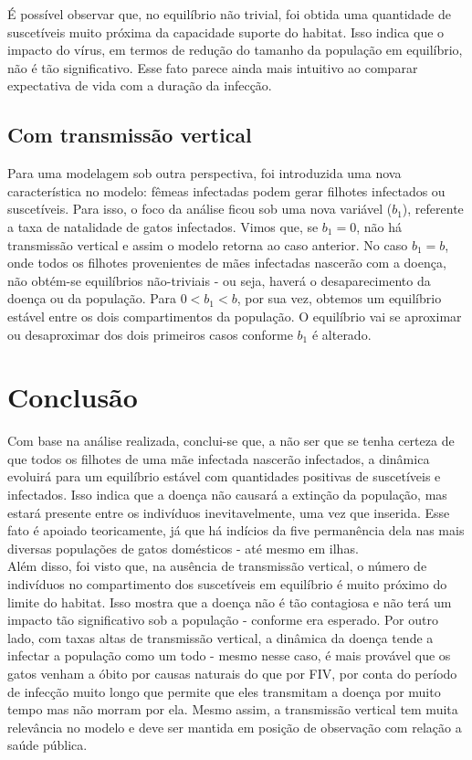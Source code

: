 \documentclass{article}
\begin{document}
\noindent É possível observar que, no equilíbrio não trivial, foi obtida uma quantidade de suscetíveis muito próxima da capacidade suporte do habitat. Isso indica que o impacto do vírus, em termos de redução do
tamanho da população em equilíbrio, não é tão significativo. Esse fato parece ainda mais intuitivo ao comparar expectativa de vida com a duração da infecção.

\subsection{Com transmissão vertical}
Para uma modelagem sob outra perspectiva, foi introduzida uma nova característica no modelo: fêmeas infectadas podem gerar filhotes infectados ou suscetíveis. Para isso, o foco da análise ficou sob uma nova variável ($b_1$), referente a taxa de natalidade de gatos infectados. Vimos que, se $b_1 = 0$, não há transmissão vertical e assim o modelo retorna ao caso anterior. No caso $b_1 = b$, onde todos os filhotes provenientes de mães infectadas nascerão com a doença, não obtém-se equilíbrios não-triviais - ou seja, haverá o desaparecimento da doença ou da população. Para $0 < b_1 < b$, por sua vez, obtemos um equilíbrio estável entre os dois compartimentos da população. O equilíbrio vai se aproximar ou desaproximar dos dois primeiros casos conforme $b_1$ é alterado.  


\newpage
\section{Conclusão}
Com base na análise realizada, conclui-se que, a não ser que se tenha certeza de que todos os filhotes de uma mãe infectada nascerão infectados, a dinâmica evoluirá para um equilíbrio estável com quantidades positivas de suscetíveis e infectados. Isso indica que a doença não causará a extinção da população, mas estará presente entre os indivíduos inevitavelmente, uma vez que inserida. Esse fato é apoiado teoricamente, já que há indícios da \gls{fiv}e permanência dela nas mais diversas populações de gatos domésticos - até mesmo em ilhas.\\

\noindent Além disso, foi visto que, na ausência de transmissão vertical, o número de indivíduos no compartimento dos suscetíveis em equilíbrio é muito próximo do limite do habitat. Isso mostra que a doença não é tão contagiosa e não terá um impacto tão significativo sob a população - conforme era esperado. Por outro lado, com taxas altas de transmissão vertical, a dinâmica da doença tende a infectar a população como um todo - mesmo nesse caso, é mais provável que os gatos venham a óbito por causas naturais do que por \gls{FIV}, por conta do período de infecção muito longo que permite que eles transmitam a doença por muito tempo mas não morram por ela. Mesmo assim, a transmissão vertical tem muita relevância no modelo e deve ser mantida em posição de observação com relação a saúde pública.\\
\end{document}
